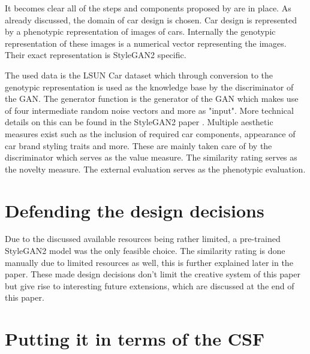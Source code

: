 It becomes clear all of the steps and components proposed by \citet{ventura} are in place.
As already discussed, the domain of car design is chosen.
Car design is represented by a phenotypic representation of images of cars.
Internally the genotypic representation of these images is a numerical vector representing the images.
Their exact representation is StyleGAN2 specific.

The used data is the LSUN Car dataset which through conversion to the genotypic representation is used as the knowledge base by the discriminator of the GAN.
The generator function is the generator of the GAN which makes use of four intermediate random noise vectors and more as "input".
More technical details on this can be found in the StyleGAN2 paper \citep{stylegan2}.
Multiple aesthetic measures exist such as the inclusion of required car components, appearance of car brand styling traits and more.
These are mainly taken care of by the discriminator which serves as the value measure.
The similarity rating serves as the novelty measure.
The external evaluation serves as the phenotypic evaluation.

\section{Defending the design decisions}
\label{sec:defending_design}

Due to the discussed available resources being rather limited, a pre-trained StyleGAN2 model was the only feasible choice.
The similarity rating is done manually due to limited resources as well, this is further explained later in the paper.
These made design decisions don't limit the creative system of this paper but give rise to interesting future extensions, which are discussed at the end of this paper.

\section{Putting it in terms of the CSF}
\label{sec:csf}


